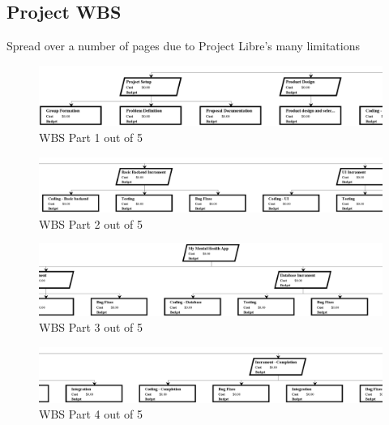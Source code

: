 \documentclass[11pt]{article}
\begin{document}
    \subsection{Project WBS}\label{subsec:project-wbs}

    Spread over a number of pages due to Project Libre's many limitations

    \begin{figure}[H]
        \centering
        \includegraphics[width=\textwidth]{ProjectLibre/WBS as PNG/Pages from My Mental Health App WBS-5_Page_1}
        \caption{WBS Part 1 out of 5}
        \label{fig:figure7}
    \end{figure}

    \begin{figure}[H]
        \centering
        \includegraphics[width=\textwidth]{ProjectLibre/WBS as PNG/Pages from My Mental Health App WBS-5_Page_2}
        \caption{WBS Part 2 out of 5}
        \label{fig:figure8}
    \end{figure}

    \begin{figure}[H]
        \centering
        \includegraphics[width=\textwidth]{ProjectLibre/WBS as PNG/Pages from My Mental Health App WBS-5_Page_3}
        \caption{WBS Part 3 out of 5}
        \label{fig:figure9}
    \end{figure}

    \begin{figure}[H]
        \centering
        \includegraphics[width=\textwidth]{ProjectLibre/WBS as PNG/Pages from My Mental Health App WBS-5_Page_4}
        \caption{WBS Part 4 out of 5}
        \label{fig:figure10}
    \end{figure}
\end{document}
